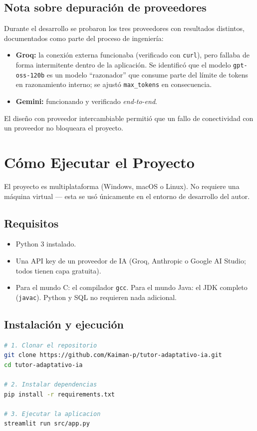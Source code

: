 \documentclass[11pt,letterpaper]{article}
\begin{document}
\subsection{Nota sobre depuración de proveedores}
Durante el desarrollo se probaron los tres proveedores con resultados
distintos, documentados como parte del proceso de ingeniería:
\begin{itemize}[leftmargin=*]
  \item \textbf{Groq:} la conexión externa funcionaba (verificado con
  \texttt{curl}), pero fallaba de forma intermitente dentro de la
  aplicación. Se identificó que el modelo \texttt{gpt-oss-120b} es un
  modelo ``razonador'' que consume parte del límite de tokens en
  razonamiento interno; se ajustó \texttt{max\_tokens} en
  consecuencia.
  \item \textbf{Gemini:} funcionando y verificado \textit{end-to-end}.
\end{itemize}
El diseño con proveedor intercambiable permitió que un fallo de
conectividad con un proveedor no bloqueara el proyecto.

\section{Cómo Ejecutar el Proyecto}

El proyecto es multiplataforma (Windows, macOS o Linux). No requiere
una máquina virtual --- esta se usó únicamente en el entorno de
desarrollo del autor.

\subsection{Requisitos}
\begin{itemize}[leftmargin=*]
  \item Python 3 instalado.
  \item Una API key de un proveedor de IA (Groq, Anthropic o Google AI
  Studio; todos tienen capa gratuita).
  \item Para el mundo C: el compilador \texttt{gcc}. Para el mundo
  Java: el JDK completo (\texttt{javac}). Python y SQL no requieren
  nada adicional.
\end{itemize}

\subsection{Instalación y ejecución}
\begin{lstlisting}[language=bash, caption={Pasos para ejecutar el proyecto}]
# 1. Clonar el repositorio
git clone https://github.com/Kaiman-p/tutor-adaptativo-ia.git
cd tutor-adaptativo-ia

# 2. Instalar dependencias
pip install -r requirements.txt

# 3. Ejecutar la aplicacion
streamlit run src/app.py
\end{lstlisting}
\end{document}
